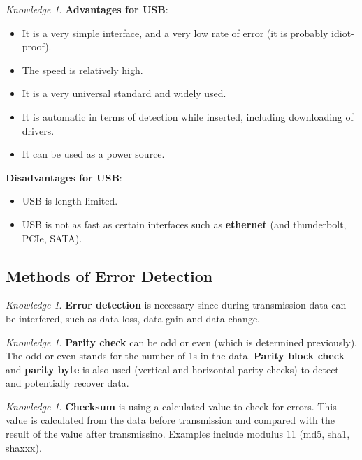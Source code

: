 \documentclass[8pt]{article}
\theoremstyle{remark}
\newtheorem{knowledge}[method]{Knowledge}
\begin{document}
        \begin{knowledge}
            \textbf{Advantages for USB}:
            \begin{itemize}
                \item It is a very simple interface, and a very low rate of error (it is probably idiot-proof).
                \item The speed is relatively high.
                \item It is a very universal standard and widely used.
                \item It is automatic in terms of detection while inserted, including downloading of drivers.
                \item It can be used as a power source.
            \end{itemize}

            \textbf{Disadvantages for USB}:
            \begin{itemize}
                \item USB is length-limited.
                \item USB is not as fast as certain interfaces such as \textbf{ethernet} (and thunderbolt, PCIe, SATA).
            \end{itemize}
        \end{knowledge}

        \subsection{Methods of Error Detection}

        \begin{knowledge}
            \textbf{Error detection} is necessary since during transmission data can be interfered, such as data loss, data gain and data change.
        \end{knowledge}
        
        \begin{knowledge}
            \textbf{Parity check} can be odd or even (which is determined previously). The odd or even stands for the number of 1s in the data. \textbf{Parity block check} and \textbf{parity byte} is also used (vertical and horizontal parity checks) to detect and potentially recover data. 
        \end{knowledge}

        \begin{knowledge}
            \textbf{Checksum} is using a calculated value to check for errors. This value is calculated from the data before transmission and compared with the result of the value after transmissino. Examples include modulus 11 (md5, sha1, shaxxx).
        \end{knowledge}
\end{document}
